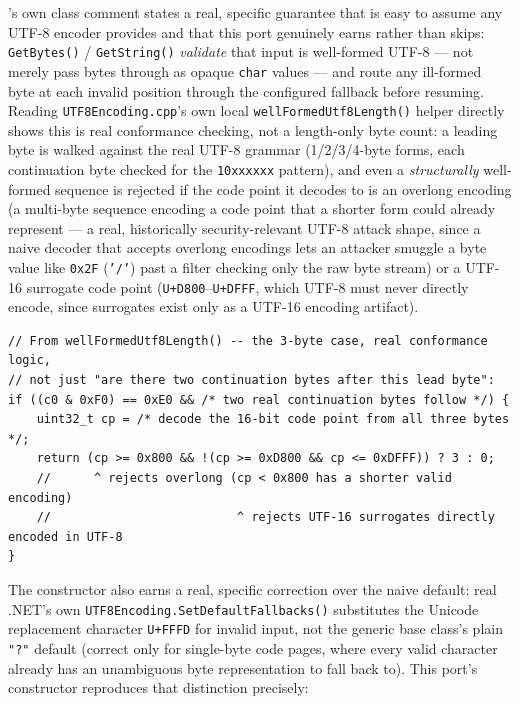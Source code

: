 's own class comment states a real, specific guarantee that is
easy to assume any UTF-8 encoder provides and that this port genuinely earns rather than
skips: \texttt{GetBytes()} / \texttt{GetString()} \emph{validate} that input is well-formed
UTF-8 --- not merely pass bytes through as opaque \texttt{char} values --- and route any
ill-formed byte at each invalid position through the configured fallback before resuming.
Reading \texttt{UTF8Encoding.cpp}'s own local \texttt{wellFormedUtf8Length()} helper directly
shows this is real conformance checking, not a length-only byte count: a leading byte is
walked against the real UTF-8 grammar (1/2/3/4-byte forms, each continuation byte checked for
the \texttt{10xxxxxx} pattern), and even a \emph{structurally} well-formed sequence is rejected
if the code point it decodes to is an overlong encoding (a multi-byte sequence encoding a code
point that a shorter form could already represent --- a real, historically security-relevant
UTF-8 attack shape, since a naive decoder that accepts overlong encodings lets an attacker
smuggle a byte value like \texttt{0x2F} (\texttt{'/'}) past a filter checking only the raw byte
stream) or a UTF-16 surrogate code point (\texttt{U+D800}--\texttt{U+DFFF}, which UTF-8 must
never directly encode, since surrogates exist only as a UTF-16 encoding artifact).

\begin{lstlisting}
// From wellFormedUtf8Length() -- the 3-byte case, real conformance logic,
// not just "are there two continuation bytes after this lead byte":
if ((c0 & 0xF0) == 0xE0 && /* two real continuation bytes follow */) {
    uint32_t cp = /* decode the 16-bit code point from all three bytes */;
    return (cp >= 0x800 && !(cp >= 0xD800 && cp <= 0xDFFF)) ? 3 : 0;
    //      ^ rejects overlong (cp < 0x800 has a shorter valid encoding)
    //                          ^ rejects UTF-16 surrogates directly encoded in UTF-8
}
\end{lstlisting}

The constructor also earns a real, specific correction over the naive default: real .NET's own
\texttt{UTF8Encoding.SetDefaultFallbacks()} substitutes the Unicode replacement character
\texttt{U+FFFD} for invalid input, not the generic  base class's plain
\texttt{"?"} default (correct only for single-byte code pages, where every valid character
already has an unambiguous byte representation to fall back to). This port's constructor
reproduces that distinction precisely:

